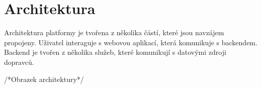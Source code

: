 \section{Architektura}
Architektura platformy je tvořena z několika částí, které jsou navzájem propojeny. Uživatel interaguje s webovou aplikací, která komunikuje s backendem. Backend je tvořen z několika služeb, které komunikují s datovými zdroji dopravců. 
\par
\hfill\par
/*Obrazek architektury*/